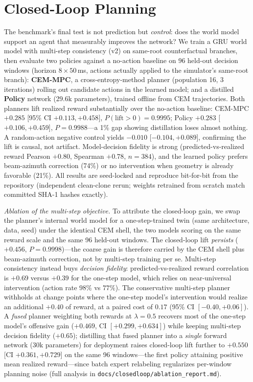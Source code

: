 \documentclass[10pt,conference]{IEEEtran}
\begin{document}
\section{Closed-Loop Planning}
The benchmark's final test is not prediction but \emph{control}: does the world model support an agent that measurably improves the network?
We train a GRU world model with multi-step consistency (v2) on same-root counterfactual branches, then evaluate two policies against a no-action baseline on 96 held-out decision windows (horizon $8\times50$\,ms, actions actually applied to the simulator's same-root branch):
\textbf{CEM-MPC}, a cross-entropy-method planner (population 16, 3 iterations) rolling out candidate actions in the learned model; and a distilled \textbf{Policy} network (29.6k parameters), trained offline from CEM trajectories.
Both planners lift realized reward substantially over the no-action baseline:
CEM-MPC $+0.285$ [95\% CI $+0.113,+0.458$], $P(\text{lift}>0)=0.9995$; Policy $+0.283$ [$+0.106,+0.459$], $P=0.9988$---a 1\% gap showing distillation loses almost nothing.
A random-action negative control yields $-0.010$ [$-0.104,+0.089$], confirming the lift is causal, not artifact.
Model-decision fidelity is strong (predicted-vs-realized reward Pearson $+0.80$, Spearman $+0.78$, $n{=}384$), and the learned policy prefers beam-azimuth correction (74\%) or no intervention when geometry is already favorable (21\%).
All results are seed-locked and reproduce bit-for-bit from the repository (independent clean-clone rerun; weights retrained from scratch match committed SHA-1 hashes exactly).
\par\noindent\emph{Ablation of the multi-step objective.} To attribute the closed-loop gain, we swap the planner's internal world model for a one-step-trained twin (same architecture, data, seed) under the identical CEM shell, the two models scoring on the same reward scale and the same 96 held-out windows. The closed-loop lift \emph{persists} ($+0.456$, $P{=}0.9998$)---the coarse gain is therefore carried by the CEM shell plus beam-azimuth correction, not by multi-step training per se. Multi-step consistency instead buys \emph{decision fidelity}: predicted-vs-realized reward correlation is $+0.69$ versus $+0.39$ for the one-step model, which relies on near-universal intervention (action rate $98\%$ vs $77\%$). The conservative multi-step planner withholds at change points where the one-step model's intervention would realize an additional $+0.40$ of reward, at a paired cost of $0.17$ (95\% CI $[-0.40,+0.06]$). A \emph{fused} planner weighting both rewards at $\lambda{=}0.5$ recovers most of the one-step model's offensive gain ($+0.469$, CI $[+0.299,+0.634]$) while keeping multi-step decision fidelity ($+0.65$); distilling that fused planner into a \emph{single} forward network (30k parameters) for deployment raises closed-loop lift further to $+0.550$ [CI $+0.361,+0.729$] on the same 96 windows---the first policy attaining positive mean realized reward---since batch expert relabeling regularizes per-window planning noise (full analysis in \texttt{docs/closedloop/ablation\_report.md}).
\end{document}
